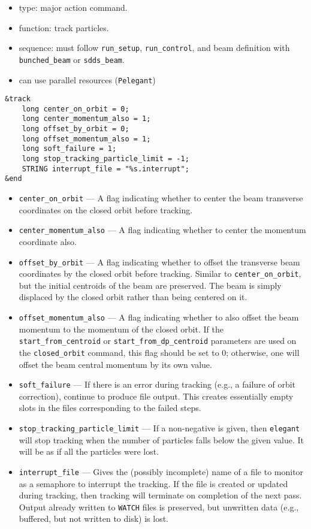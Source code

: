 \documentclass[11pt]{article}
\begin{document}
\begin{itemize}
\item type: major action command.
\item function: track particles.
\item sequence: must follow \verb|run_setup|, \verb|run_control|, and beam definition with \verb|bunched_beam| or \verb|sdds_beam|.
\item can use parallel resources (\verb|Pelegant|)
\end{itemize}

\begin{verbatim}
&track
    long center_on_orbit = 0;
    long center_momentum_also = 1;
    long offset_by_orbit = 0;
    long offset_momentum_also = 1;
    long soft_failure = 1;
    long stop_tracking_particle_limit = -1;
    STRING interrupt_file = "%s.interrupt";
&end
\end{verbatim}

\begin{itemize}
\item \verb|center_on_orbit| --- A flag indicating whether to center
the beam transverse coordinates on the closed orbit before tracking.
\item \verb|center_momentum_also| --- A flag indicating whether to
center the momentum coordinate also.
\item \verb|offset_by_orbit| --- A flag indicating whether to offset
the transverse beam coordinates by the closed orbit before tracking.
Similar to \verb|center_on_orbit|, but the initial centroids of the
beam are preserved.  The beam is simply displaced by the closed orbit
rather than being centered on it.
\item \verb|offset_momentum_also| --- A flag indicating whether to also
offset the beam momentum to the momentum of the closed orbit.  If the
\verb|start_from_centroid| or \verb|start_from_dp_centroid| parameters are 
used on the \verb|closed_orbit| command, this flag should be set to
0; otherwise, one will offset the beam central momentum by its own value.
\item \verb|soft_failure| --- If there is an error during tracking (e.g.,
a failure of orbit correction), continue to produce file output.  This
creates essentially empty slots in the files corresponding to the failed
steps.
\item \verb|stop_tracking_particle_limit| --- If a non-negative is given, then
{\tt elegant} will stop tracking when the number of particles falls below the
given value.  It will be as if all the particles were lost.
\item \verb|interrupt_file| --- Gives the (possibly incomplete) name of a file to monitor
  as a semaphore to interrupt the tracking. If the file is created or updated during tracking, 
  then tracking will terminate on completion of the next pass.
  Output already written to \verb|WATCH| files is preserved, but unwritten data
  (e.g., buffered, but not written to disk) is lost.
\end{itemize}
\end{document}
